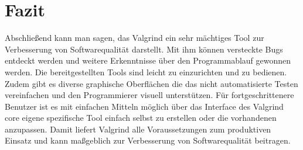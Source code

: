 \section{Fazit}
Abschließend kann man sagen, das Valgrind ein sehr mächtiges Tool zur Verbesserung von Softwarequalität darstellt. Mit ihm können versteckte Bugs entdeckt werden und weitere Erkenntnisse über den Programmablauf gewonnen werden. Die bereitgestellten Tools sind leicht zu einzurichten und zu bedienen. Zudem gibt es diverse graphische Oberflächen die das nicht automatisierte Testen vereinfachen und den Programmierer visuell unterstützen.
Für fortgeschrittenere Benutzer ist es mit einfachen Mitteln möglich über das Interface des Valgrind core eigene spezifische Tool einfach selbst zu erstellen oder die vorhandenen anzupassen. Damit liefert Valgrind alle Voraussetzungen zum produktiven Einsatz und kann maßgeblich zur Verbesserung von Softwarequalität beitragen.